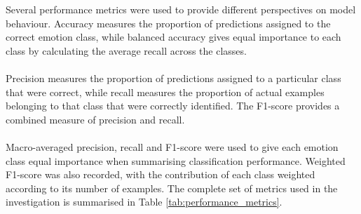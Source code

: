 \documentclass[12pt, a4paper]{report}
\begin{document}
				Several performance metrics were used to provide different perspectives on model behaviour. Accuracy measures the proportion of predictions assigned to the correct emotion class, while balanced accuracy gives equal importance to each class by calculating the average recall across the classes.\\\\
				Precision measures the proportion of predictions assigned to a particular class that were correct, while recall measures the proportion of actual examples belonging to that class that were correctly identified. The F1-score provides a combined measure of precision and recall.\\\\
				Macro-averaged precision, recall and F1-score were used to give each emotion class equal importance when summarising classification performance. Weighted F1-score was also recorded, with the contribution of each class weighted according to its number of examples. The complete set of metrics used in the investigation is summarised in Table \ref{tab:performance_metrics}.\\
\end{document}
